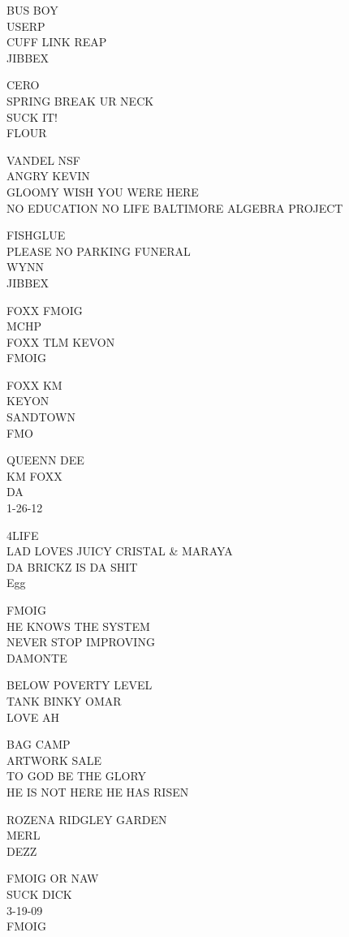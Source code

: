 \documentclass[10pt,letterpaper]{article}
\begin{document}
BUS BOY\\
USERP\\
CUFF LINK REAP\\
JIBBEX

CERO\\
SPRING BREAK UR NECK\\
SUCK IT!\\
FLOUR

VANDEL NSF\\
ANGRY KEVIN\\
GLOOMY WISH YOU WERE HERE\\
NO EDUCATION NO LIFE BALTIMORE ALGEBRA PROJECT

FISHGLUE\\
PLEASE NO PARKING FUNERAL\\
WYNN\\
JIBBEX

FOXX FMOIG\\
MCHP\\
FOXX TLM KEVON\\
FMOIG

FOXX KM\\
KEYON\\
SANDTOWN\\
FMO

QUEENN DEE\\
KM FOXX\\
DA\\
1{-}26{-}12

4LIFE\\
LAD LOVES JUICY CRISTAL \& MARAYA\\
DA BRICKZ IS DA SHIT\\
Egg

FMOIG\\
HE KNOWS THE SYSTEM\\
NEVER STOP IMPROVING\\
DAMONTE

BELOW POVERTY LEVEL\\
TANK BINKY OMAR\\
LOVE AH

BAG CAMP\\
ARTWORK SALE\\
TO GOD BE THE GLORY\\
HE IS NOT HERE HE HAS RISEN

ROZENA RIDGLEY GARDEN\\
MERL\\
DEZZ

FMOIG OR NAW\\
SUCK DICK\\
3{-}19{-}09\\
FMOIG
\end{document}
